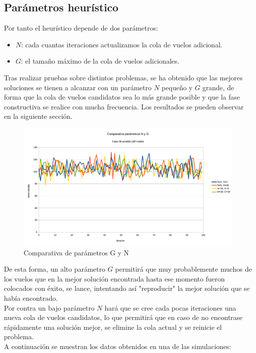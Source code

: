 \subsection{Parámetros heurístico}
Por tanto el heurístico depende de dos parámetros:
\begin{itemize}
	\item \textbf{$N$}: cada cuantas iteraciones actualizamos la cola de vuelos adicional.
	\item \textbf{$G$}: el tamaño máximo de la cola de vuelos adicionales.
\end{itemize}
Tras realizar pruebas sobre distintos problemas, se ha obtenido que las mejores soluciones se tienen a alcanzar con un parámetro $N$ pequeño y $G$ grande, de forma que la cola de vuelos candidatos sea lo más grande posible y que la fase constructiva se realice con mucha frecuencia. Los resultados se pueden observar en la siguiente sección.

\begin{figure}[H]
	\begin{center}
		\centering
		\includegraphics[width=1\textwidth]{./imagenes/heuristico/comparativa_parametros_100_vuelos.png}
		\caption{Comparativa de parámetros G y N}
		\label{fig: Comparativa de parámetros G y N}
	\end{center}
\end{figure}

De esta forma, un alto parámetro $G$ permitirá que muy probablemente muchos de los vuelos que en la mejor solución encontrada hasta ese momento fueron colocados con éxito, se lance, intentando así "reproducir" la mejor solución que se había encontrado. \\
Por contra un bajo parámetro $N$ hará que se cree cada pocas iteraciones una nueva cola de vuelos candidatos, lo que permitirá que en caso de no encontrase rápidamente una solución mejor, se elimine la cola actual y se reinicie el problema.\\
A continuación se muestran los datos obtenidos en una de las simulaciones:



